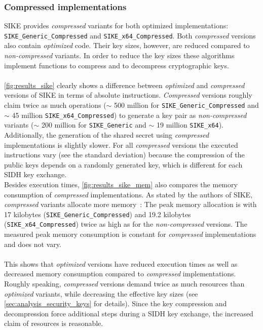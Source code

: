 \subsubsection{Compressed implementations}
\gls{SIKE} provides \textit{compressed} variants for both optimized implementations:\\ \texttt{SIKE\_Generic\_Compressed} and \texttt{SIKE\_x64\_Compressed}.
Both \textit{compressed} versions also contain \textit{optimized} code. Their key sizes, however, are reduced compared to \textit{non-compressed} variants. In order to reduce the key sizes these algorithms implement functions to compress and to decompress cryptographic keys.
\\\\
\autoref{fig:results_sike} clearly shows a difference between \textit{optimized} and \textit{compressed} versions of \gls{SIKE} in terms of absolute instructions. \textit{Compressed} versions roughly claim twice as much operations ($\sim$ 500 million for \texttt{SIKE\_Generic\_Compressed} and $\sim$ 45 million \texttt{SIKE\_x64\_Compressed}) to generate a key pair as \textit{non-compressed} variants ($\sim$ 200 million for \texttt{SIKE\_Generic} and $\sim$ 19 million \texttt{SIKE\_x64}). Additionally, the generation of the shared secret using \textit{compressed} implementations is slightly slower. For all \textit{compressed} versions the executed instructions vary (see the standard deviation) because the compression of the public keys depends on a randomly generated key, which is different for each \gls{SIDH} key exchange.\\
Besides execution times, \autoref{fig:results_sike_mem} also compares the memory consumption of \textit{compressed} implementations. As stated by the authors of \gls{SIKE}, \textit{compressed} variants allocate more memory~\parencite{sike2020spec}: The peak memory allocation is with 17 kilobytes (\texttt{SIKE\_Generic\_Compressed}) and 19.2 kilobytes (\texttt{SIKE\_x64\_Compressed}) twice as high as for the \textit{non-compressed} versions. The measured peak memory consumption is constant for \textit{compressed} implementations and does not vary.
\\\\
This shows that \textit{optimized} versions have reduced execution times as well as decreased memory consumption compared to \textit{compressed} implementations. Roughly speaking, \textit{compressed} versions demand twice as much resources than \textit{optimized} variants, while decreasing the effective key sizes (see \autoref{sec:analysis_security_keys} for details). Since the key compression and decompression force additional steps during a \gls{SIDH} key exchange, the increased claim of resources is reasonable.



